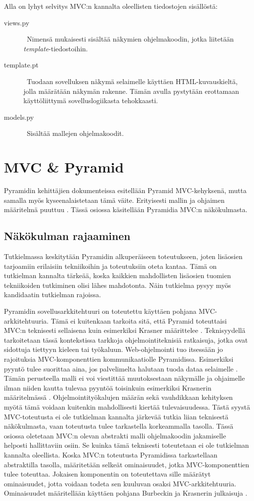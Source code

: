 \documentclass[finnish,utf8,nonumbib,palatino,kandi]{gradu2}
\begin{document}
Alla on lyhyt selvitys MVC:n kannalta oleellisten tiedostojen sisällöstä:
\begin{description}
\item [views.py] \ Nimensä mukaisesti sisältää näkymien ohjelmakoodin, jotka liitetään \emph{template}-tiedostoihin.
\item[template.pt] \ Tuodaan sovelluksen näkymä selaimelle käyttäen HTML-kuvauskieltä, jolla määrätään näkymän rakenne. Tämän avulla pystytään erottamaan käyttöliittymä sovelluslogiikasta tehokkaasti.
\item[models.py] \ Sisältää mallejen ohjelmakoodit.
\end{description}

\section{MVC \& Pyramid}
Pyramidin kehittäjien dokumenteissa esitellään Pyramid MVC-kehyksenä, mutta samalla myös kyseenalaistetaan tämä väite. Erityisesti mallin ja ohjaimen määritelmä puuttuu \cite{Pyramid:intr}. Tässä
osiossa käsitellään Pyramidia MVC:n näkökulmasta. 

\subsection{Näkökulman rajaaminen}
Tutkielmassa keskitytään Pyramidin alkuperäiseen toteutukseen, joten lisäosien tarjoamiin erilaisiin tekniikoihin ja toteutuksiin oteta kantaa. Tämä on tutkielman kannalta tärkeää, koska kaikkien
mahdollisten lisäosien tuomien tekniikoiden tutkiminen olisi lähes mahdotonta. Näin tutkielma pysyy myös kandidaatin tutkielman rajoissa.

Pyramidin sovellusarkkitehtuuri on toteutettu käyttäen pohjana MVC-arkkitehtuuria. Tämä ei kuitenkaan tarkoita sitä, että Pyramid toteuttaisi MVC:n teknisesti sellaisena kuin esimerkiksi Krasner määrittelee \cite{Krasner:desc}. Teknisyydellä
tarkoitetaan tässä kontekstissa tarkkoja ohjelmointiteknisiä ratkaisuja, jotka ovat sidottuja tiettyyn kieleen tai työkaluun. Web-ohjelmointi tuo itsessään jo rajoituksia MVC-komponenttien kommunikaatiolle
Pyramidissa. Esimerkiksi pyyntö tulee suorittaa aina, jos palvelimelta halutaan tuoda dataa selaimelle \cite{Web}. Tämän perusteella malli ei voi viestittää muutoksestaan näkymälle ja ohjaimelle ilman niiden kautta tulevaa pyyntöä toisinkuin esimerkiksi Krasnerin määritelmässä \cite{Krasner}. Ohjelmointityökalujen määrän sekä vauhdikkaan kehityksen myötä tämä voidaan kuitenkin mahdollisesti kiertää tulevaisuudessa. Tästä syystä MVC-toteutusta ei ole tutkielman kannalta järkevää tutkia liian teknisestä näkökulmasta, vaan toteutusta tulee tarkastella korkeammalla tasolla. Tässä osiossa oletetaan MVC:n olevan abstrakti malli ohjelmakoodin jakamiselle helposti hallittaviin osiin. Se kuinka tämä teknisesti toteutetaan ei ole tutkielman kannalta oleellista.
Koska MVC:n toteutusta Pyramidissa tarkastellaan abstraktilla tasolla, määritetään selkeät ominaisuudet, jotka MVC-komponenttien tulee toteuttaa. Jokaisen komponentin on toteutettava sille määrätyt ominaisuudet, jotta voidaan todeta sen kuuluvan osaksi MVC-arkkitehtuuria. Ominaisuudet määritellään käyttäen pohjana Burbeckin ja Krasnerin julkaisuja \cite{Burbeck, Krasner:desc}.
\end{document}
